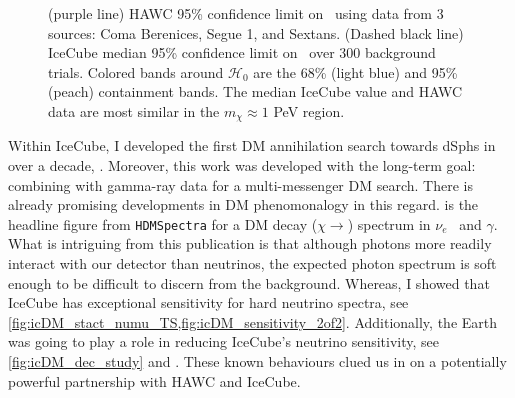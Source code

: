 \begin{figure}[t]
    \caption{(purple line) HAWC 95\% confidence limit on \sv~using data from 3 sources: Coma Berenices, Segue 1, and Sextans. (Dashed black line) IceCube median 95\% confidence limit on \sv~over 300 background trials. Colored bands around $\mathcal{H}_0$ are the 68\% (light blue) and 95\% (peach) containment bands. The median IceCube value and HAWC data are most similar in the $m_\chi \approx 1$ PeV region.}
    \label{fig:nuDuck_sens}
\end{figure}

Within IceCube, I developed the first DM annihilation search towards dSphs in over a decade, .
Moreover, this work was developed with the long-term goal: combining with gamma-ray data for a multi-messenger DM search.
There is already promising developments in DM phenomonalogy in this regard.
 is the headline figure from \texttt{HDMSpectra} \cite{Rodd:HDM_spec} for a DM decay ($\chi \rightarrow$) spectrum in $\nu_e$~ and $\gamma$.
What is intriguing from this publication is that although photons more readily interact with our detector than neutrinos, the expected photon spectrum is soft enough to be difficult to discern from the background.
Whereas, I showed that IceCube has exceptional sensitivity for hard neutrino spectra, see \cref{fig:icDM_stact_numu_TS,fig:icDM_sensitivity_2of2}.
Additionally, the Earth was going to play a role in reducing IceCube's neutrino sensitivity, see \cref{fig:icDM_dec_study} and \cite{IC3:Earth_Attenuation}.
These known behaviours clued us in on a potentially powerful partnership with HAWC and IceCube.

